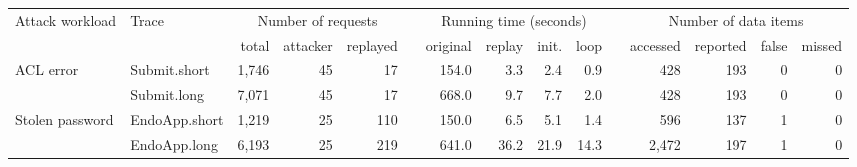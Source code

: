 \centering
\small
\setlength{\tabcolsep}{3pt}
\begin{tabular}{@{~}l l rrr c rrrr c rrrr@{~}}
\toprule
\multirow{2}{*}{Attack workload} &
\multirow{2}{*}{Trace} &
\multicolumn{3}{c}{Number of requests} & &
\multicolumn{4}{c}{Running time (seconds)} & &
\multicolumn{4}{c}{Number of data items}
\\ \cmidrule{3-5} \cmidrule{7-10} \cmidrule{12-15}
& & total & attacker & replayed &
  & original & replay & init. & loop &
          & accessed & reported 
          & false & missed
\\ \midrule
ACL error       & Submit.short
    & 1,746 & 45 & 17 &
    & 154.0 & 3.3 & 2.4  & 0.9 &
            & 428 & 193 & 0 & 0 \\
                & Submit.long
    & 7,071 & 45 & 17 &
    & 668.0 & 9.7 & 7.7 & 2.0 &
            & 428 & 193 & 0 & 0 \\
Stolen password & EndoApp.short
    & 1,219 & 25 & 110 &
    & 150.0 & 6.5 & 5.1 & 1.4 &
            & 596 & 137 & 1 & 0 \\
                & EndoApp.long
    & 6,193 & 25 & 219 &
    & 641.0 & 36.2 & 21.9 & 14.3 &
            & 2,472 & 197 & 1 & 0 \\
\bottomrule
\end{tabular}

